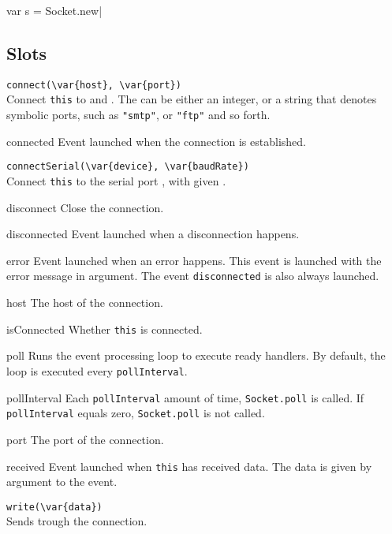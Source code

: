 \begin{urbiscript}
var s = Socket.new|
\end{urbiscript}

\subsection{Slots}
\begin{urbiscriptapi}

\item \lstinline|connect(\var{host}, \var{port})|\\
  Connect \lstinline|this| to  and .  The
   can be either an integer, or a string that denotes
  symbolic ports, such as \lstinline|"smtp"|, or \lstinline|"ftp"| and
  so forth.

\item[connected]
  Event launched when the connection is established.

\item \lstinline|connectSerial(\var{device}, \var{baudRate})|\\
  Connect \lstinline|this| to the serial port , with given
  .

\item[disconnect]
  Close the connection.

\item[disconnected]
  Event launched when a disconnection happens.

\item[error]
  Event launched when an error happens. This event is launched with
  the error message in argument. The event \lstinline|disconnected| is
  also always launched.

\item[host]
  The host of the connection.

\item[isConnected]
  Whether \lstinline|this| is connected.

\item[poll]
  Runs the event processing loop to execute ready handlers. By
  default, the loop is executed every \lstinline|pollInterval|.

\item[pollInterval]
  Each \lstinline|pollInterval| amount of time, \lstinline|Socket.poll|
  is called. If \lstinline|pollInterval| equals zero,
  \lstinline|Socket.poll| is not called.

\item[port]
  The port of the connection.

\item[received]
  Event launched when \lstinline|this| has received data. The data is
  given by argument to the event.

\item \lstinline|write(\var{data})|\\
  Sends  trough the connection.

\end{urbiscriptapi}

